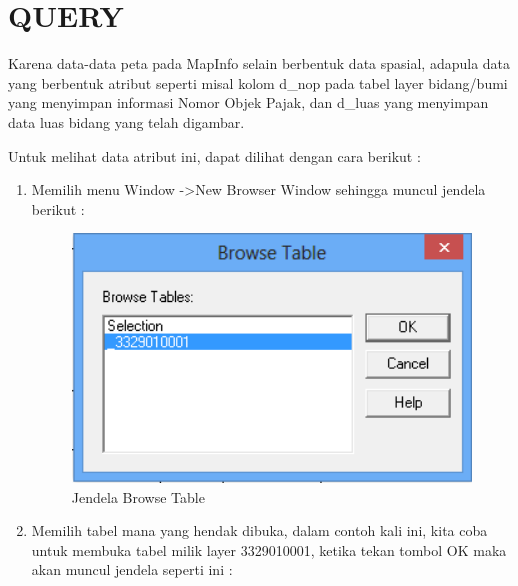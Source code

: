 \chapter{QUERY}

Karena data-data peta pada MapInfo selain berbentuk data spasial, adapula data yang berbentuk atribut seperti misal kolom d\_nop pada tabel layer bidang/bumi yang menyimpan informasi Nomor Objek Pajak, dan d\_luas yang menyimpan data luas bidang yang telah digambar.

Untuk melihat data atribut ini, dapat dilihat dengan cara berikut :

\begin{enumerate}[1.]
  \item Memilih menu Window -\textgreater New Browser Window sehingga muncul jendela berikut :
  
  \begin{figure}[H]
    \centering
    \includegraphics[width=1\textwidth]{./resources/065-jendela-browse-tabel}
    \caption{Jendela Browse Table}
  \end{figure}
  
  \item Memilih tabel mana yang hendak dibuka, dalam contoh kali ini, kita coba untuk membuka tabel milik layer 3329010001, ketika tekan tombol OK maka akan muncul jendela seperti ini :
  

\end{enumerate}
